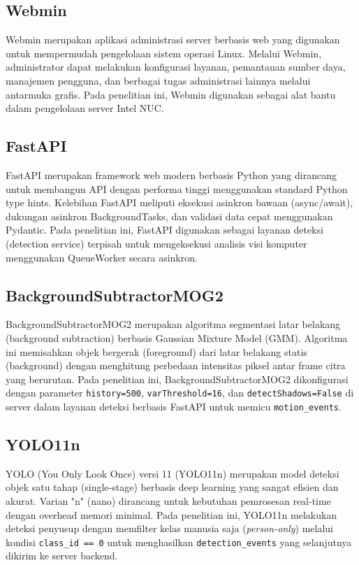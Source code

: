 \subsection{Webmin}

Webmin merupakan aplikasi administrasi server berbasis web yang digunakan untuk mempermudah pengelolaan sistem operasi Linux. Melalui Webmin, administrator dapat melakukan konfigurasi layanan, pemantauan sumber daya, manajemen pengguna, dan berbagai tugas administrasi lainnya melalui antarmuka grafis. Pada penelitian ini, Webmin digunakan sebagai alat bantu dalam pengelolaan server Intel NUC.

\subsection{FastAPI}

FastAPI merupakan framework web modern berbasis Python yang dirancang untuk membangun API dengan performa tinggi menggunakan standard Python type hints. Kelebihan FastAPI meliputi eksekusi asinkron bawaan (async/await), dukungan asinkron BackgroundTasks, dan validasi data cepat menggunakan Pydantic. Pada penelitian ini, FastAPI digunakan sebagai layanan deteksi (detection service) terpisah untuk mengeksekusi analisis visi komputer menggunakan QueueWorker secara asinkron.

\subsection{BackgroundSubtractorMOG2}

BackgroundSubtractorMOG2 merupakan algoritma segmentasi latar belakang (background subtraction) berbasis Gaussian Mixture Model (GMM). Algoritma ini memisahkan objek bergerak (foreground) dari latar belakang statis (background) dengan menghitung perbedaan intensitas piksel antar frame citra yang berurutan. Pada penelitian ini, BackgroundSubtractorMOG2 dikonfigurasi dengan parameter \texttt{history=500}, \texttt{varThreshold=16}, dan \texttt{detectShadows=False} di server dalam layanan deteksi berbasis FastAPI untuk memicu \texttt{motion\_events}.

\subsection{YOLO11n}

YOLO (You Only Look Once) versi 11 (YOLO11n) merupakan model deteksi objek satu tahap (single-stage) berbasis deep learning yang sangat efisien dan akurat. Varian "n" (nano) dirancang untuk kebutuhan pemrosesan real-time dengan overhead memori minimal. Pada penelitian ini, YOLO11n melakukan deteksi penyusup dengan memfilter kelas manusia saja (\textit{person-only}) melalui kondisi \texttt{class\_id == 0} untuk menghasilkan \texttt{detection\_events} yang selanjutnya dikirim ke server backend.

